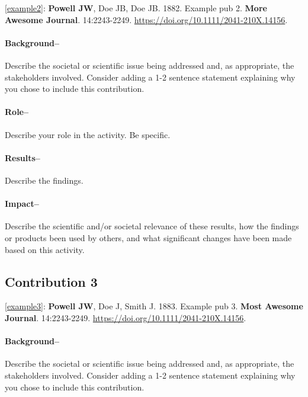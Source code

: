 \noindent
\ref{example2}: \textbf{Powell JW}, Doe JB, Doe JB.
1882.
Example pub 2.
\textbf{More Awesome Journal}. 14:2243-2249.
\url{https://doi.org/10.1111/2041-210X.14156}.

 
\paragraph{Background--} 

Describe the societal or scientific issue being addressed and, as appropriate, the stakeholders involved. Consider adding a 1-2 sentence statement explaining why you chose to include this contribution.

\paragraph{Role--}

Describe your role in the activity. Be specific.

\paragraph{Results--} 

Describe the findings.

\paragraph{Impact--} 

Describe the scientific and/or societal relevance of these results, how the findings or products been used by others, and what significant changes have been made based on this activity.


\newpage

\subsection*{Contribution 3}

\noindent
\ref{example3}: \textbf{Powell JW}, Doe J, Smith J.
1883.
Example pub 3.
\textbf{Most Awesome Journal}. 14:2243-2249.
\url{https://doi.org/10.1111/2041-210X.14156}.

\paragraph{Background--} 

Describe the societal or scientific issue being addressed and, as appropriate, the stakeholders involved. Consider adding a 1-2 sentence statement explaining why you chose to include this contribution.

